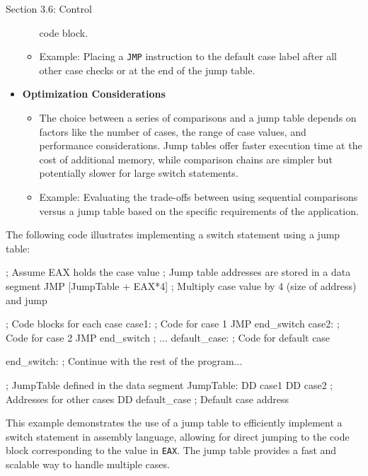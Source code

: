 \begin{notes}{Section 3.6: Control}
\begin{itemize}
\begin{itemize}
            code block.
            \item Example: Placing a \texttt{JMP} instruction to the default case label after all other case checks or at the end of the jump table.
        \end{itemize}
        \item \textbf{Optimization Considerations}
        \begin{itemize}
            \item The choice between a series of comparisons and a jump table depends on factors like the number of cases, the range of case values, and performance considerations. Jump tables offer 
            faster execution time at the cost of additional memory, while comparison chains are simpler but potentially slower for large switch statements.
            \item Example: Evaluating the trade-offs between using sequential comparisons versus a jump table based on the specific requirements of the application.
        \end{itemize}
    \end{itemize}
    
    \begin{highlight}
        The following code illustrates implementing a switch statement using a jump table:
    
    \begin{code}[Assembly]
    ; Assume EAX holds the case value
    ; Jump table addresses are stored in a data segment
    JMP [JumpTable + EAX*4]  ; Multiply case value by 4 (size of address) and jump
    
        ; Code blocks for each case
    case1:
        ; Code for case 1
        JMP end_switch
    case2:
        ; Code for case 2
        JMP end_switch
        ; ...
    default_case:
        ; Code for default case
    
    end_switch:
    ; Continue with the rest of the program...

    ; JumpTable defined in the data segment
    JumpTable:
        DD case1
        DD case2
        ; Addresses for other cases
        DD default_case  ; Default case address
    \end{code}
    
        This example demonstrates the use of a jump table to efficiently implement a switch statement in assembly language, allowing for direct jumping to the code block corresponding to the value in 
        \texttt{EAX}. The jump table provides a fast and scalable way to handle multiple cases.
    \end{highlight}    
\end{notes}

